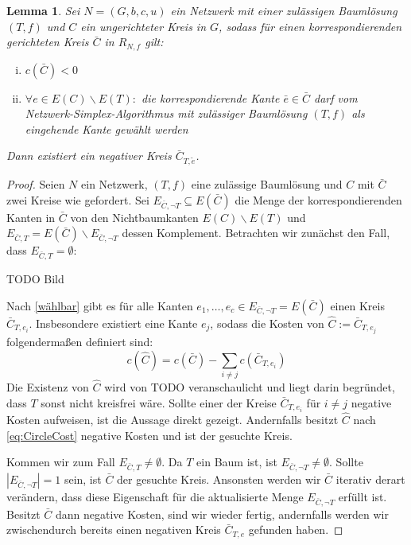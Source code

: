 \documentclass[a4paper,twoside,ngerman]{report}
\theoremstyle{plain}
\newtheorem{lem}[thm]{Lemma}
\theoremstyle{definition}
\begin{document}
\begin{lem}\label{iterierbar}Sei $N=(G,b,c,u)$ ein Netzwerk mit einer zulässigen Baumlösung $(T,f)$ und $C$ ein ungerichteter Kreis in $G$, sodass für einen korrespondierenden gerichteten Kreis $\bar{C}$ in $R_{N,f}$ gilt:
\begin{enumerate}[(i)]
	\item $c(\bar{C})<0$
	\item $\forall e\in E(C)\backslash E(T) :$ die korrespondierende Kante $\bar{e}\in\bar{C}$ darf vom Netzwerk-Simplex-Algorithmus mit zulässiger Baumlösung $(T,f)$ als eingehende Kante gewählt werden\label{wählbar}
\end{enumerate}
Dann existiert ein negativer Kreis $\bar{C}_{T,\tilde{e}}$.
\end{lem}
\begin{proof}Seien $N$ ein Netzwerk, $(T,f)$ eine zulässige Baumlösung und $C$ mit $\bar{C}$ zwei Kreise wie gefordert. Sei $E_{\bar{C},\neg T}\subseteq E(\bar{C})$ die Menge der korrespondierenden Kanten in $\bar{C}$ von den Nichtbaumkanten $E(C)\backslash E(T)$ und $E_{\bar{C},T}=E(\bar{C})\backslash E_{\bar{C},\neg T}$ dessen Komplement. Betrachten wir zunächst den Fall, dass $E_{\bar{C},T}=\emptyset$:

TODO Bild

Nach \cref{wählbar} gibt es für alle Kanten $e_1,\ldots,e_c\in E_{\bar{C},\neg T}=E(\bar{C})$ einen Kreis $\bar{C}_{T,e_i}$. Insbesondere existiert eine Kante $e_j$, sodass die Kosten von $\hat{C}:=\bar{C}_{T,e_j}$ folgendermaßen definiert sind:
\begin{equation}\label{eq:CircleCost}
c(\hat{C})=c(\bar{C})-\sum_{i\neq j} c(\bar{C}_{T,e_i})
\end{equation}
Die Existenz von $\hat{C}$ wird von TODO veranschaulicht und liegt darin begründet, dass $T$ sonst nicht kreisfrei wäre. Sollte einer der Kreise $\bar{C}_{T,e_i}$ für $i\neq j$ negative Kosten aufweisen, ist die Aussage direkt gezeigt. Andernfalls besitzt $\hat{C}$ nach \cref{eq:CircleCost} negative Kosten und ist der gesuchte Kreis.

Kommen wir zum Fall $E_{\bar{C},T}\neq\emptyset$. Da $T$ ein Baum ist, ist $E_{\bar{C},\neg T}\neq\emptyset$. Sollte $|E_{\bar{C},\neg T}|=1$ sein, ist $\bar{C}$ der gesuchte Kreis. Ansonsten werden wir $\bar{C}$ iterativ derart verändern, dass diese Eigenschaft für die aktualisierte Menge $E_{\bar{C},\neg T}$ erfüllt ist. Besitzt $\bar{C}$ dann negative Kosten, sind wir wieder fertig, andernfalls werden wir zwischendurch bereits einen negativen Kreis $\bar{C}_{T,e}$ gefunden haben.


\end{proof}
\end{document}
